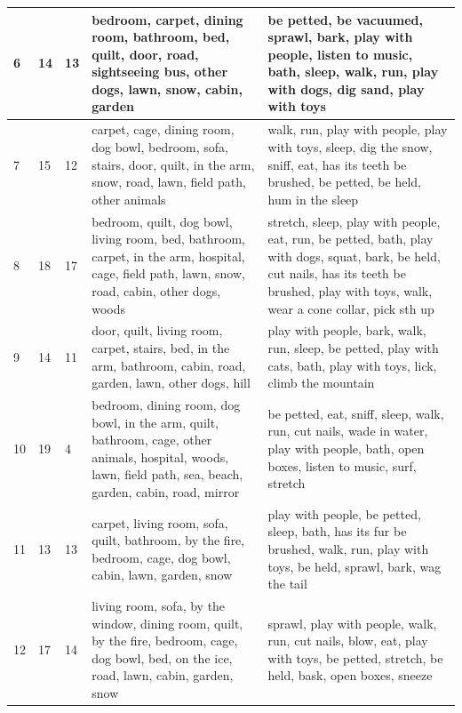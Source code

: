 \begin{table}[th]
\begin{center}
\begin{tabular}{l p{1cm} p{1cm} p{5cm} p{5cm}}
6 & 14 & 13 & bedroom, carpet, dining room, bathroom, bed, quilt, door, road, sightseeing bus, other dogs, lawn, snow, cabin, garden & be petted, be vacuumed, sprawl, bark, play with people, listen to music, bath, sleep, walk, run, play with dogs, dig sand, play with toys\\\hline

7 & 15 & 12 & carpet, cage, dining room, dog bowl, bedroom, sofa, stairs, door, quilt, in the arm, snow, road, lawn, field path, other animals & walk, run, play with people, play with toys, sleep, dig the snow, sniff, eat, has its teeth be brushed, be petted, be held, hum in the sleep\\\hline

8 & 18 & 17 & bedroom, quilt, dog bowl, living room, bed, bathroom, carpet, in the arm, hospital, cage, field path, lawn, snow, road, cabin, other dogs, woods & stretch, sleep, play with people, eat, run, be petted, bath, play with dogs, squat, bark, be held, cut nails, has its teeth be brushed, play with toys, walk, wear a cone collar, pick sth up\\\hline

9 & 14 & 11 & door, quilt, living room, carpet, stairs, bed, in the arm, bathroom, cabin, road, garden, lawn, other dogs, hill & play with people, bark, walk, run, sleep, be petted, play with cats, bath, play with toys, lick, climb the mountain\\\hline

10 & 19 & 4 & bedroom, dining room, dog bowl, in the arm, quilt, bathroom, cage, other animals, hospital, woods, lawn, field path, sea, beach, garden, cabin, road, mirror & be petted, eat, sniff, sleep, walk, run, cut nails, wade in water, play with people, bath, open boxes, listen to music, surf, stretch\\\hline

11 & 13 & 13 & carpet, living room, sofa, quilt, bathroom, by the fire, bedroom, cage, dog bowl, cabin, lawn, garden, snow & play with people, be petted, sleep, bath, has its fur be brushed, walk, run, play with toys, be held, sprawl, bark, wag the tail\\\hline

12 & 17 & 14 & living room, sofa, by the window, dining room, quilt, by the fire, bedroom, cage, dog bowl, bed, on the ice, road, lawn, cabin, garden, snow & sprawl, play with people, walk, run, cut nails, blow, eat, play with toys, be petted, stretch, be held, bask, open boxes, sneeze\\\hline


\end{tabular}
\end{center}
\end{table}
